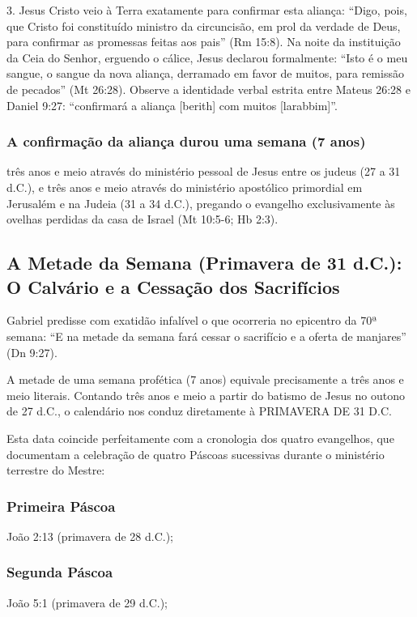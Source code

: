 \documentclass[11pt,a4paper,openany]{book}
\begin{document}
3. Jesus Cristo veio à Terra exatamente para confirmar esta aliança: ``Digo, pois, que Cristo foi constituído ministro da circuncisão, em prol da verdade de Deus, para confirmar as promessas feitas aos pais'' (Rm 15:8). Na noite da instituição da Ceia do Senhor, erguendo o cálice, Jesus declarou formalmente: ``Isto é o meu sangue, o sangue da nova aliança, derramado em favor de muitos, para remissão de pecados'' (Mt 26:28). Observe a identidade verbal estrita entre Mateus 26:28 e Daniel 9:27: ``confirmará a aliança [berith] com muitos [larabbim]''.

\subsubsection*{A confirmação da aliança durou uma semana (7 anos)}
três anos e meio através do ministério pessoal de Jesus entre os judeus (27 a 31 d.C.), e três anos e meio através do ministério apostólico primordial em Jerusalém e na Judeia (31 a 34 d.C.), pregando o evangelho exclusivamente às ovelhas perdidas da casa de Israel (Mt 10:5-6; Hb 2:3).



\subsection{A Metade da Semana (Primavera de 31 d.C.): O Calvário e a Cessação dos Sacrifícios}


Gabriel predisse com exatidão infalível o que ocorreria no epicentro da 70ª semana:
``E na metade da semana fará cessar o sacrifício e a oferta de manjares'' (Dn 9:27).

A metade de uma semana profética (7 anos) equivale precisamente a três anos e meio literais. Contando três anos e meio a partir do batismo de Jesus no outono de 27 d.C., o calendário nos conduz diretamente à PRIMAVERA DE 31 D.C.

Esta data coincide perfeitamente com a cronologia dos quatro evangelhos, que documentam a celebração de quatro Páscoas sucessivas durante o ministério terrestre do Mestre:

\subsubsection*{Primeira Páscoa}
João 2:13 (primavera de 28 d.C.);

\subsubsection*{Segunda Páscoa}
João 5:1 (primavera de 29 d.C.);
\end{document}
